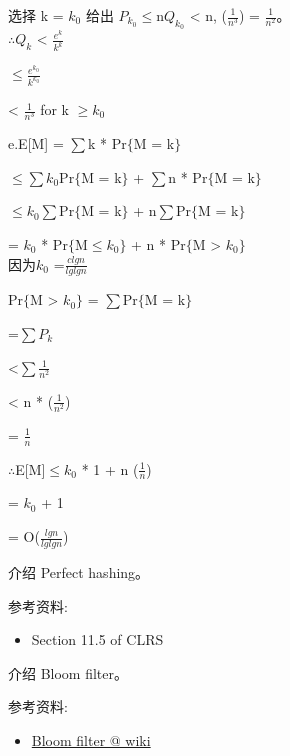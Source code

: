 \documentclass[a4paper, justified]{tufte-handout}
\begin{document}
\begin{solution}
        选择 k = $k_0$ 给出 $P_{k_0}$$\le$n$Q_{k_0}$ < n, ($\frac{1}{n^3}$) = $\frac{1}{n ^2}$。\\
    $\therefore$$Q_k$ < $\frac{e^k}{k^k}$

  $\le$$\frac{e^{k_0}}{k^{k_0}}$

      < $\frac{1}{n^3}$ for k $\ge$$k_0$

        e.E[M] = $\sum$k * Pr$\{$M = k$\}$

  $\le$$\sum$$k_0$Pr$\{$M = k$\}$ + $\sum$n * Pr$\{$M = k$\}$

  $\le$$k_0$$\sum$Pr$\{$M = k$\}$ + n$\sum$Pr$\{$M = k$\}$

        = $k_0$ * Pr$\{$M$\le$$k_0$$\}$ + n * Pr$\{$M > $k_0$$\}$\\
      因为$k_0$ =$\frac{clgn}{lglgn}$

      Pr$\{$M > $k_0$$\}$ = $\sum$Pr$\{$M = k$\}$

        =$\sum$$P_k$

      <$\sum$$\frac{1}{n^2}$

        < n * ($\frac{1}{n^2}$)

        = $\frac{1}{n}$

  $\therefore$E[M]$\le$$k_0$ * 1 + n ($\frac{1}{n}$)

      = $k_0$ + 1

      = O($\frac{lgn}{lglgn}$)
\end{solution}

\beginoptional

\begin{problem}[TC 11.2-6]
\end{problem}

\begin{solution}
\end{solution}

\beginot

\begin{ot}
  介绍 Perfect hashing。

  \noindent 参考资料:
  \begin{itemize}
    \item Section 11.5 of CLRS
  \end{itemize}
\end{ot}

\begin{ot}
  介绍 Bloom filter。

  \noindent 参考资料:
  \begin{itemize}
    \item \href{https://en.wikipedia.org/wiki/Bloom\_filter}{Bloom filter @ wiki}
  \end{itemize}
\end{ot}
\end{document}
